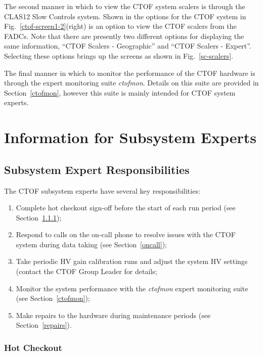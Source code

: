 \documentclass[12pt]{article}
\begin{document}
The second manner in which to view the CTOF system scalers is through the CLAS12 Slow Controls system.
Shown in the options for the CTOF system in Fig.~\ref{ctof-screen1-2}(right) is an option to view the CTOF
scalers from the FADCs. Note that there are presently two different options for displaying the same
information, ``CTOF Scalers - Geographic'' and ``CTOF Scalers - Expert''. Selecting these options brings
up the screens as shown in Fig.~\ref{sc-scalers}.

The final manner in which to monitor the performance of the CTOF hardware is through the expert monitoring
suite {\it ctofmon}. Details on this suite are provided in Section~\ref{ctofmon}, however this suite is mainly
intended for CTOF system experts.

\clearpage

\vfil
\eject

\section{Information for Subsystem Experts}

\subsection{Subsystem Expert Responsibilities}

The CTOF subsystem experts have several key responsibilities:

\begin{enumerate}
\item Complete hot checkout sign-off before the start of each run period (see Section~\ref{checkout});
\item Respond to calls on the on-call phone to resolve issues with the CTOF system during data taking (see
Section~\ref{oncall});
\item Take periodic HV gain calibration runs and adjust the system HV settings (contact the CTOF Group
Leader for details;
\item Monitor the system performance with the {\it ctofmon} expert monitoring suite (see
Section~\ref{ctofmon});
\item Make repairs to the hardware during maintenance periods (see Section~\ref{repairs}).
\end{enumerate}

\subsubsection{Hot Checkout}
\label{checkout}
\end{document}
